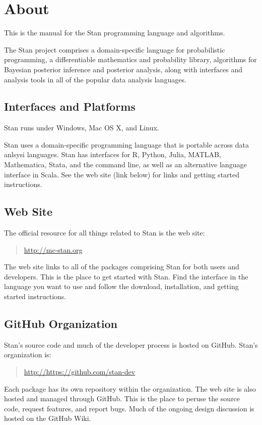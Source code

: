 \chapter*{About}

\noindent
This is the manual for the Stan programming language and algorithms.

The Stan project comprises a domain-specific language for
probabilistic programming, a differentiable mathematics and
probability library, algorithms for Bayesian posterior inference and
posterior analysis, along with interfaces and analysis tools in all of
the popular data analysis languages.


\section*{Interfaces and Platforms}

Stan runs under Windows, Mac OS X, and Linux.

Stan uses a domain-specific programming language that is portable
across data anlsysi languages.  Stan has interfaces for R, Python,
Julia, MATLAB, Mathematica, Stata, and the command line, as well
as an alternative language interface in Scala.  See the web
site (link below) for links and getting started instructions.

\section*{Web Site}

The official resource for all things related to Stan is the web site:
%
\begin{quote}
\url{http://mc-stan.org}
\end{quote}
%
The web site links to all of the packages comprising Stan for both
users and developers.  This is the place to get started with Stan.
Find the interface in the language you want to use and follow the
download, installation, and getting started instructions.  


\section*{GitHub Organization}

Stan's source code and much of the developer process is hosted on
GitHub.  Stan's organization is:
%
\begin{quote}
\url{http://https://github.com/stan-dev}
\end{quote}
%
Each package has its own repository within the 
organization.  The web site is also hosted and managed through GitHub.
This is the place to peruse the source code, request features, and
report bugs.  Much of the ongoing design discussion is hosted on the
GitHub Wiki.


